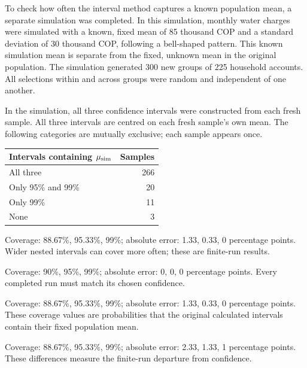 To check how often the interval method captures a known population mean, a separate simulation was completed. In this simulation, monthly water charges were simulated with a known, fixed mean of 85 thousand COP and a standard deviation of 30 thousand COP, following a bell-shaped pattern. This known simulation mean is separate from the fixed, unknown mean in the original population. The simulation generated 300 new groups of 225 household accounts. All selections within and across groups were random and independent of one another.

In the simulation, all three confidence intervals were constructed from each fresh sample.
All three intervals are centred on each fresh sample's own mean. The following categories are mutually exclusive; each sample appears once.
\begin{center}\begin{tabular}{@{}lr@{}}\toprule
Intervals containing $\mu_{\rm sim}$ & Samples\\\midrule
All three & 266 \\[6pt]
Only 95\% and 99\% & 20 \\[6pt]
Only 99\% & 11 \\[6pt]
None & 3 \\[6pt]
\bottomrule\end{tabular}\end{center}

\begin{answeroptions}
\item Coverage: 88.67\%, 95.33\%, 99\%; absolute error: 1.33, 0.33, 0 percentage points. Wider nested intervals can cover more often; these are finite-run results.
\item Coverage: 90\%, 95\%, 99\%; absolute error: 0, 0, 0 percentage points. Every completed run must match its chosen confidence.
\item Coverage: 88.67\%, 95.33\%, 99\%; absolute error: 1.33, 0.33, 0 percentage points. These coverage values are probabilities that the original calculated intervals contain their fixed population mean.
\item Coverage: 88.67\%, 95.33\%, 99\%; absolute error: 2.33, 1.33, 1 percentage points. These differences measure the finite-run departure from confidence.
\end{answeroptions}
\clearpage
